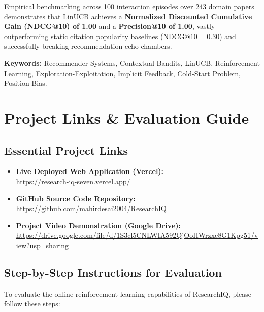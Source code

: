 \documentclass[11pt,a4paper]{article}
\begin{document}
Empirical benchmarking across 100 interaction episodes over 243 domain papers demonstrates that LinUCB achieves a \textbf{Normalized Discounted Cumulative Gain (NDCG@10) of 1.00} and a \textbf{Precision@10 of 1.00}, vastly outperforming static citation popularity baselines ($\text{NDCG@10} = 0.30$) and successfully breaking recommendation echo chambers.

\vspace{0.5cm}
\textbf{Keywords:} Recommender Systems, Contextual Bandits, LinUCB, Reinforcement Learning, Exploration-Exploitation, Implicit Feedback, Cold-Start Problem, Position Bias.

\newpage

\section*{\centering Project Links \& Evaluation Guide}

\vspace{0.4cm}

\subsection*{Essential Project Links}
\begin{itemize}[leftmargin=1.8em, itemsep=6pt]
    \item \textbf{Live Deployed Web Application (Vercel):} \\
    \url{https://research-iq-seven.vercel.app/}
    
    \item \textbf{GitHub Source Code Repository:} \\
    \url{https://github.com/mahirdesai2004/ResearchIQ}
    
    \item \textbf{Project Video Demonstration (Google Drive):} \\
    \url{https://drive.google.com/file/d/1S3cl5CNLWIA592QjOoHWrzxc8G1Kpg51/view?usp=sharing}
\end{itemize}

\vspace{0.6cm}

\subsection*{Step-by-Step Instructions for Evaluation}
To evaluate the online reinforcement learning capabilities of ResearchIQ, please follow these steps:
\end{document}
